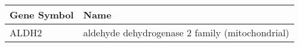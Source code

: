\begin{tabular}{ll}
\toprule
Gene Symbol &                                            Name \\
\midrule
      ALDH2 & aldehyde dehydrogenase 2 family (mitochondrial) \\
\bottomrule
\end{tabular}
